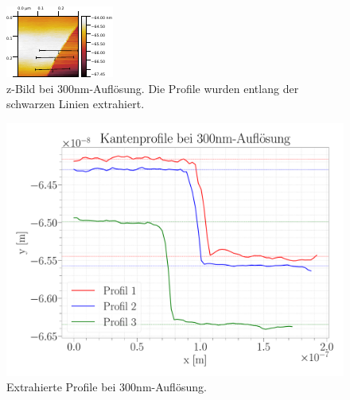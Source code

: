 \begin{figure}[H]
\centering
\includegraphics[width=\textwidth]{../Gwyddion/HOPG/300nm.pdf}
\caption{z-Bild bei {300}{nm}-Auflösung. Die Profile wurden entlang der schwarzen Linien extrahiert.}
\label{300nm}
\end{figure}	

\begin{figure}[H]
\centering
\includegraphics[width=\textwidth]{../Figures/300nm_profiles.pdf}
\caption{Extrahierte Profile bei {300}{nm}-Auflösung.}
\label{300nmProfiles}
\end{figure}	

